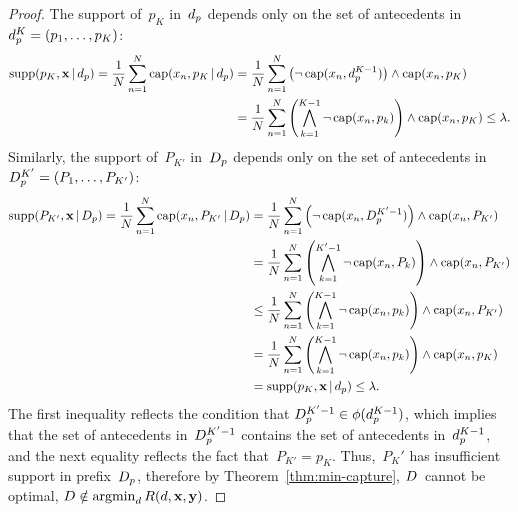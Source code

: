 \begin{proof}
The support of~$p_K$ in~$d_p$ depends only on the
set of antecedents in ${d_p^{K} = (p_1, \dots, p_{K})}$:
\begin{align}
\Supp(p_K, \x \given \Prefix)
= \frac{1}{N} \sum_{n=1}^N \Cap(x_n, p_K \given \Prefix)
&= \frac{1}{N} \sum_{n=1}^N \left( \neg\, \Cap(x_n, \Prefix^{K-1}) \right)
  \wedge \Cap(x_n, p_K) \nn \\
&= \frac{1}{N} \sum_{n=1}^N \left( \bigwedge_{k=1}^{K-1} \neg\, \Cap(x_n, p_k) \right)
  \wedge \Cap(x_n, p_K)
\le \Reg.
\end{align}
Similarly, the support of~$P_{K'}$ in~$D_p$ depends only on
the set of antecedents in ${D_p^{K'} = (P_1, \dots, P_{K'})}$:
\begin{align}
\Supp(P_{K'}, \x \given \PrefixB)
= \frac{1}{N} \sum_{n=1}^N \Cap(x_n, P_{K'} \given \PrefixB)
&= \frac{1}{N} \sum_{n=1}^N \left( \neg\, \Cap(x_n, \PrefixB^{K'-1}) \right)
  \wedge \Cap(x_n, P_{K'}) \nn \\
&= \frac{1}{N} \sum_{n=1}^N \left( \bigwedge_{k=1}^{K'-1} \neg\, \Cap(x_n, P_k) \right)
   \wedge \Cap(x_n, P_{K'}) \nn \\
&\le \frac{1}{N} \sum_{n=1}^N \left( \bigwedge_{k=1}^{K-1} \neg\, \Cap(x_n, p_k) \right)
  \wedge \Cap(x_n, P_{K'}) \nn \\
&= \frac{1}{N} \sum_{n=1}^N \left( \bigwedge_{k=1}^{K-1} \neg\, \Cap(x_n, p_k) \right)
  \wedge \Cap(x_n, p_{K}) \nn \\
&= \Supp(p_K, \x \given \Prefix) \le \Reg.
\label{ineq:supp}
\end{align}
The first inequality reflects the condition that
${D_p^{K'-1} \in \phi(d_p^{K-1})}$,
which implies that the set of antecedents in~$D_p^{K'-1}$
contains the set of antecedents in~$d_p^{K-1}$,
and the next equality reflects the fact that~${P_{K'} = p_K}$.
%
Thus,~$P_K'$ has insufficient support in prefix~$D_p$,
therefore by Theorem~\ref{thm:min-capture}, ${D}$~cannot be optimal,
\ie ${{D} \notin \operatorname*{argmin}_{{d}} R({d}, \mathbf{x}, \mathbf{y})}$.
\end{proof}

